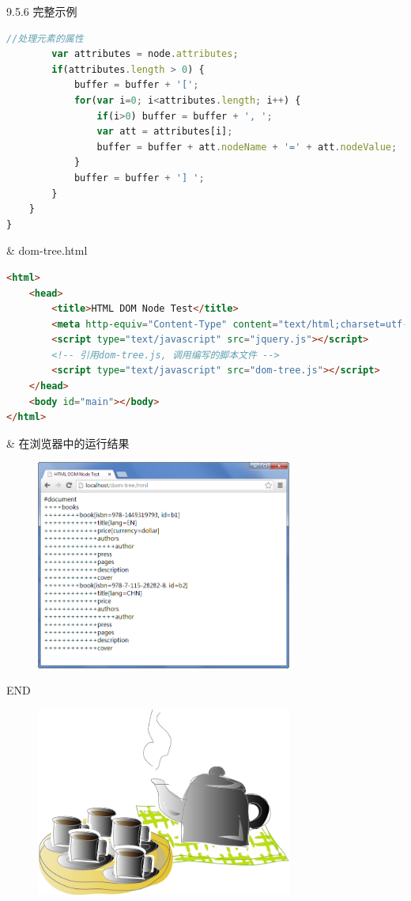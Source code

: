 \begin{frame}{9.5.6 完整示例}
\begin{easylist}
\begin{lstlisting}[tabsize=8, basicstyle=\small\tt, language=JavaScript]
        //处理元素的属性
        var attributes = node.attributes; 
        if(attributes.length > 0) {
            buffer = buffer + '['; 
            for(var i=0; i<attributes.length; i++) {
                if(i>0) buffer = buffer + ', '; 
                var att = attributes[i]; 
                buffer = buffer + att.nodeName + '=' + att.nodeValue; 
            }
            buffer = buffer + '] ';
        }
    }
}
\end{lstlisting}
& dom-tree.html
\begin{lstlisting}[tabsize=8, basicstyle=\small\tt, language=HTML]
<html>
    <head>
        <title>HTML DOM Node Test</title>
        <meta http-equiv="Content-Type" content="text/html;charset=utf-8" />
        <script type="text/javascript" src="jquery.js"></script>
        <!-- 引用dom-tree.js, 调用编写的脚本文件 -->
        <script type="text/javascript" src="dom-tree.js"></script>
    </head>
    <body id="main"></body>
</html>
\end{lstlisting}
& 在浏览器中的运行结果
\begin{figure}
    \includegraphics[width=0.75\textwidth]{figure/dom-tree.png}
\end{figure}
\end{easylist}
\end{frame}



\begin{frame}
\begin{center}
    \Huge END
\end{center}
\begin{figure}
    \includegraphics[width=0.75\textwidth]{figure/relax.png}
\end{figure}
\end{frame}
